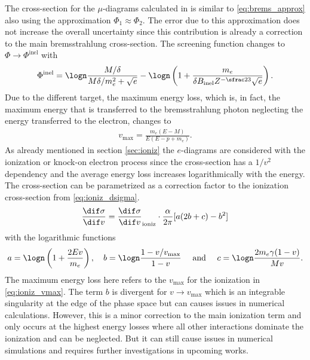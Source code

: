 The cross-section for the $\mu$-diagrams calculated in \cite{Kelner95Brems} is similar to \eqref{eq:brems_approx} also using the approximation $\Phi_1 \approx \Phi_2$.
The error due to this approximation does not increase the overall uncertainty since this contribution is already a correction to the main bremsstrahlung cross-section.
The screening function changes to $\Phi \to \Phi^{\text{inel}}$ with
\begin{align}
\Phi^{\text{inel}} =
    \logn \frac{M/\delta}{M\delta/m_e^2 + \sqrt{e}} - \logn \left( 1 + \frac{m_e}{\delta B_{\text{inel}}Z^{-\sfrac23}\sqrt{e}} \right) .
\end{align}
Due to the different target, the maximum energy loss, which is, in fact, the maximum energy that is transferred to the bremsstrahlung photon neglecting the energy transferred to the electron, changes to
\begin{align}
    v_{\text{max}} = \frac{m_e (E - M)}{E ( E - p + m_e)} .
\end{align}
As already mentioned in section \ref{sec:ioniz} the $e$-diagrams are considered with the ionization or knock-on electron process since the cross-section has a $1/v^2$ dependency and the average energy loss increases logarithmically with the energy.
The cross-section can be parametrized \cite{Kelner97Brems} as a correction factor to the ionization cross-section from \eqref{eq:ioniz_dsigma}.
\begin{align} \label{eq:brems_e_diagram}
\frac{\dif \sigma}{\dif v} =
    \frac{\dif \sigma}{\dif v}_{\text{ioniz}} \cdot
    \frac{\alpha}{2\pi} [ a(2b + c) - b^2 ]
\end{align}
with the logarithmic functions
\begin{align}
    a = \logn \left( 1 + \frac{2Ev}{m_e} \right), \quad
    b = \logn \frac{1 - v/v_{\text{max}}}{1 - v}
    \quad
    \text{ and }
    \quad
    c = \logn \frac{2 m_e \gamma (1-v)}{M v}.
\end{align}
The maximum energy loss here refers to the $v_{\text{max}}$ for the ionization in \eqref{eq:ioniz_vmax}.
The term $b$ is divergent for $v \to v_{\text{max}}$ which is an integrable singularity at the edge of the phase space but can causes issues in numerical calculations.
However, this is a minor correction to the main ionization term and only occurs at the highest energy losses where all other interactions dominate the ionization and can be neglected.
But it can still cause issues in numerical simulations and requires further investigations in upcoming works.

